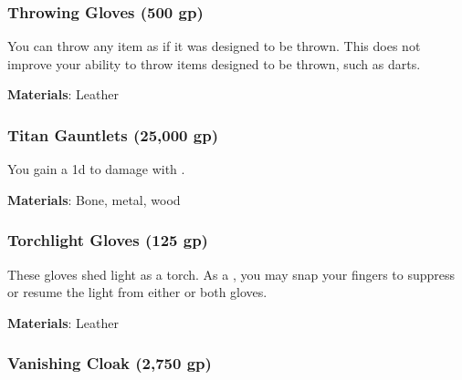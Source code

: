 \lowercase{\hypertarget{item:Throwing Gloves}{}}\label{item:Throwing Gloves}
\hypertarget{item:Throwing Gloves}{\subsubsection{Throwing Gloves\hfill{} (500 gp)}}

You can throw any item as if it was designed to be thrown.
This does not improve your ability to throw items designed to be thrown, such as darts.



\vspace{0.25em}
\textbf{Materials}: Leather


\lowercase{\hypertarget{item:Titan Gauntlets}{}}\label{item:Titan Gauntlets}
\hypertarget{item:Titan Gauntlets}{\subsubsection{Titan Gauntlets\hfill{} (25,000 gp)}}

You gain a \plus1d  to damage with .



\vspace{0.25em}
\textbf{Materials}: Bone, metal, wood


\lowercase{\hypertarget{item:Torchlight Gloves}{}}\label{item:Torchlight Gloves}
\hypertarget{item:Torchlight Gloves}{\subsubsection{Torchlight Gloves\hfill{} (125 gp)}}

These gloves shed light as a torch.
As a , you may snap your fingers to suppress or resume the light from either or both gloves.



\vspace{0.25em}
\textbf{Materials}: Leather


\lowercase{\hypertarget{item:Vanishing Cloak}{}}\label{item:Vanishing Cloak}
\hypertarget{item:Vanishing Cloak}{\subsubsection{Vanishing Cloak\hfill{} (2,750 gp)}}

